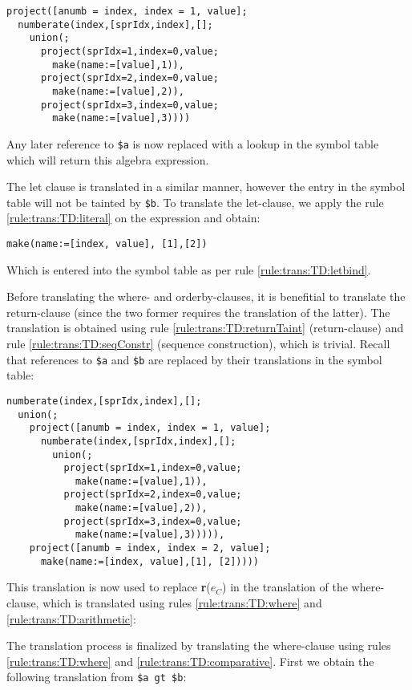 \begin{Verbatim}
project([anumb = index, index = 1, value];
  numberate(index,[sprIdx,index],[];
    union(;
      project(sprIdx=1,index=0,value;
        make(name:=[value],1)),
      project(sprIdx=2,index=0,value;
        make(name:=[value],2)),
      project(sprIdx=3,index=0,value;
        make(name:=[value],3))))
\end{Verbatim}

Any later reference to \texttt{\$a} is now replaced with a lookup in the symbol
table which will return this algebra expression.

The let clause is translated in a similar manner, however the entry in the
symbol table will not be tainted by \texttt{\$b}. To translate the let-clause,
we apply the rule \ref{rule:trans:TD:literal} on the expression and obtain:

\begin{Verbatim}
make(name:=[index, value], [1],[2])
\end{Verbatim}

Which is entered into the symbol table as per rule \ref{rule:trans:TD:letbind}.

Before translating the where- and orderby-clauses, it is benefitial to
translate the return-clause (since the two former requires the translation of
the latter). The translation is obtained using rule
\ref{rule:trans:TD:returnTaint} (return-clause) and rule
\ref{rule:trans:TD:seqConstr} (sequence construction), which is trivial. Recall
that references to \texttt{\$a} and \texttt{\$b} are replaced by their
translations in the symbol table:

\begin{Verbatim}
numberate(index,[sprIdx,index],[];
  union(;
    project([anumb = index, index = 1, value];
      numberate(index,[sprIdx,index],[];
        union(;
          project(sprIdx=1,index=0,value;
            make(name:=[value],1)),
          project(sprIdx=2,index=0,value;
            make(name:=[value],2)),
          project(sprIdx=3,index=0,value;
            make(name:=[value],3))))),
    project([anumb = index, index = 2, value];
      make(name:=[index, value],[1], [2]))))
\end{Verbatim}

This translation is now used to replace \textbf{r}($e_C$) in the translation
of the where-clause, which is translated using rules \ref{rule:trans:TD:where}
and \ref{rule:trans:TD:arithmetic}:

The translation process is finalized by translating the where-clause using rules
\ref{rule:trans:TD:where} and \ref{rule:trans:TD:comparative}. First we
obtain the following translation from \texttt{\$a gt \$b}:

